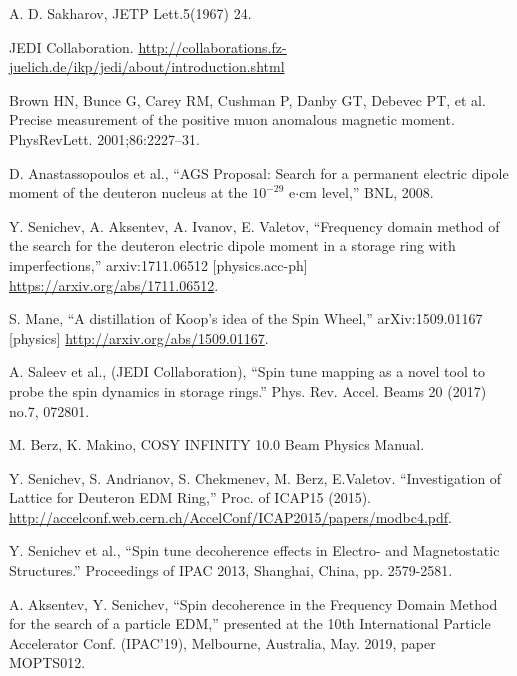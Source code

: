 \documentclass[]{elsarticle}
\begin{document}
\begin{thebibliography}{9}

  A. D. Sakharov, JETP Lett.5(1967) 24.

  JEDI Collaboration. \url{http://collaborations.fz-juelich.de/ikp/jedi/about/introduction.shtml}

  Brown HN, Bunce G, Carey RM, Cushman P, Danby GT, Debevec PT, et al.
  Precise measurement of the positive muon anomalous magnetic moment. PhysRevLett. 2001;86:2227–31. 

  
  D. Anastassopoulos et al., ``AGS Proposal: Search for a permanent electric dipole moment of
  the deuteron nucleus at the $10^{-29}$ e$\cdot$cm level,'' BNL, 2008.

  Y. Senichev, A. Aksentev, A. Ivanov, E. Valetov, ``Frequency domain method of the search for
  the deuteron electric dipole moment in a storage ring with imperfections,'' arxiv:1711.06512 [physics.acc-ph]
  \url{https://arxiv.org/abs/1711.06512}.

  S. Mane, ``A distillation of Koop's idea of the Spin Wheel,'' arXiv:1509.01167 [physics]
  \url{http://arxiv.org/abs/1509.01167}.

  A. Saleev et al., (JEDI Collaboration), ``Spin tune mapping as a novel tool to probe
  the spin dynamics in storage rings.'' Phys. Rev. Accel. Beams 20 (2017) no.7, 072801.

  M. Berz, K. Makino, COSY INFINITY 10.0 Beam Physics Manual.

  Y. Senichev, S. Andrianov, S. Chekmenev, M. Berz, E.Valetov. ``Investigation of Lattice for Deuteron EDM Ring,''
  Proc. of ICAP15 (2015). \url{http://accelconf.web.cern.ch/AccelConf/ICAP2015/papers/modbc4.pdf}.

  
  Y. Senichev et al., ``Spin tune decoherence effects in Electro- and Magnetostatic Structures.''
  Proceedings of IPAC 2013, Shanghai, China, pp. 2579-2581.

  A. Aksentev, Y. Senichev, ``Spin decoherence in the Frequency Domain Method for the search of a particle EDM,''
  presented at the 10th International Particle Accelerator Conf. (IPAC'19), Melbourne, Australia,
  May. 2019, paper MOPTS012.



\end{thebibliography}
\end{document}
